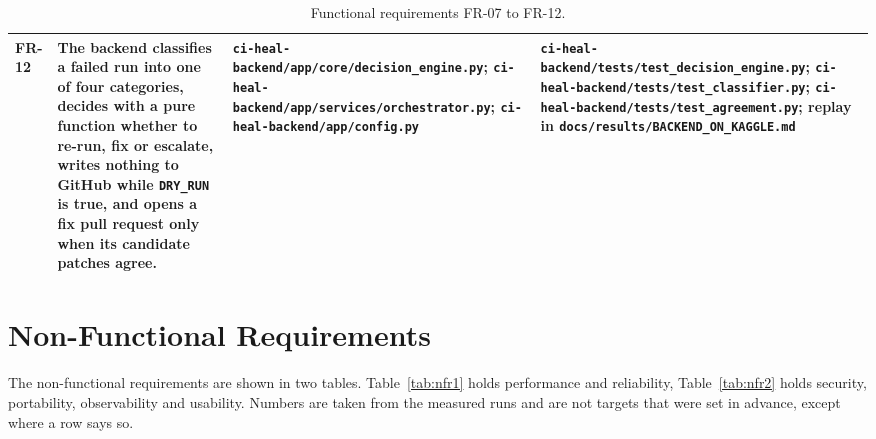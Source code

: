 \begin{table}[!htbp]
\begin{tabularx}{\linewidth}{>{\raggedright\arraybackslash}p{1.2cm}>{\raggedright\arraybackslash}X>{\raggedright\arraybackslash}X>{\raggedright\arraybackslash}X}
FR-12 & The backend classifies a failed run into one of four categories, decides with a pure function whether to re-run, fix or escalate, writes nothing to GitHub while \texttt{DRY\_RUN} is true, and opens a fix pull request only when its candidate patches agree. & \texttt{ci-heal-backend/\allowbreak{}app/\allowbreak{}core/\allowbreak{}decision\_\allowbreak{}engine.py}; \texttt{ci-heal-backend/\allowbreak{}app/\allowbreak{}services/\allowbreak{}orchestrator.py}; \texttt{ci-heal-backend/\allowbreak{}app/\allowbreak{}config.py} & \texttt{ci-heal-backend/\allowbreak{}tests/\allowbreak{}test\_\allowbreak{}decision\_\allowbreak{}engine.py}; \texttt{ci-heal-backend/\allowbreak{}tests/\allowbreak{}test\_\allowbreak{}classifier.py}; \texttt{ci-heal-backend/\allowbreak{}tests/\allowbreak{}test\_\allowbreak{}agreement.py}; replay in \texttt{docs/\allowbreak{}results/\allowbreak{}BACKEND\_\allowbreak{}ON\_\allowbreak{}KAGGLE.md} \\
\bottomrule
\end{tabularx}
\caption{Functional requirements FR-07 to FR-12.}
\label{tab:fr2}
\end{table}

\section{Non-Functional Requirements}

The non-functional requirements are shown in two tables. Table~\ref{tab:nfr1} holds performance and reliability, Table~\ref{tab:nfr2} holds security, portability, observability and usability. Numbers are taken from the measured runs and are not targets that were set in advance, except where a row says so.

